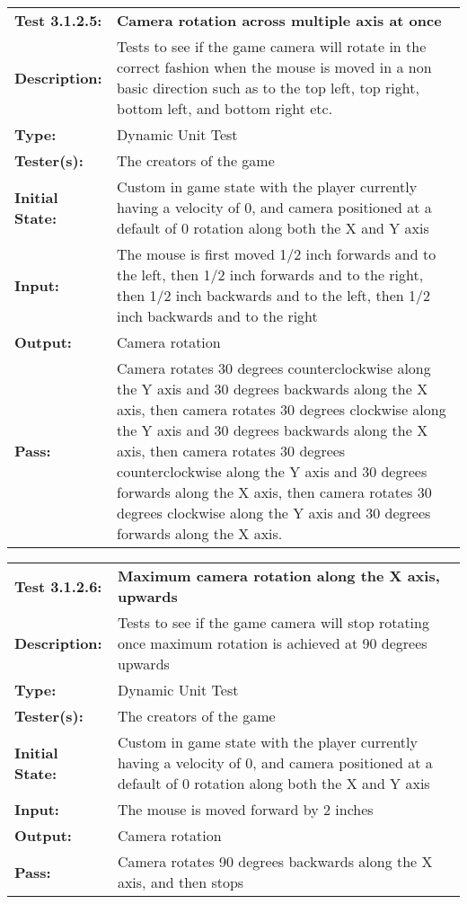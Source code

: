 \documentclass[12pt, titlepage]{article}
\begin{document}
\begin{mdframed}[linewidth=1pt]
\begin{tabularx}{\textwidth}{@{}p{3cm}X@{}}
{\bf Test 3.1.2.5:} & {\bf Camera rotation across multiple axis at once}\\[\baselineskip]
{\bf Description:} & Tests to see if the game camera will rotate in the correct fashion when the mouse is moved in a non basic direction such as to the top left,  top right, bottom left, and bottom right etc. \\[0.5\baselineskip]
{\bf Type:} & Dynamic Unit Test\\[0.5\baselineskip]
{\bf Tester(s):} & The creators of the game\\[0.5\baselineskip]
{\bf Initial State:} & Custom in game state with the player currently having a velocity of 0, and camera positioned at a default of 0 rotation along both the X and Y axis\\[0.5\baselineskip]
{\bf Input:} & The mouse is first moved 1/2 inch forwards and to the left, then 1/2 inch forwards and to the right, then 1/2 inch backwards and to the left, then 1/2 inch backwards and to the right\\[0.5\baselineskip]
{\bf Output:} & Camera rotation\\[0.5\baselineskip]
{\bf Pass:} & Camera rotates 30 degrees counterclockwise along the Y axis and 30 degrees backwards along the X axis, then camera rotates 30 degrees clockwise along the Y axis and 30 degrees backwards along the X axis, then camera rotates 30 degrees counterclockwise along the Y axis and 30 degrees forwards along the X axis, then camera rotates 30 degrees clockwise along the Y axis and 30 degrees forwards along the X axis.
\end{tabularx}
\end{mdframed}

\begin{mdframed}[linewidth=1pt]
\begin{tabularx}{\textwidth}{@{}p{3cm}X@{}}
{\bf Test 3.1.2.6:} & {\bf Maximum camera rotation along the X axis, upwards}\\[\baselineskip]
{\bf Description:} & Tests to see if the game camera will stop rotating once maximum rotation is achieved at 90 degrees upwards\\[0.5\baselineskip]
{\bf Type:} & Dynamic Unit Test\\[0.5\baselineskip]
{\bf Tester(s):} & The creators of the game\\[0.5\baselineskip]
{\bf Initial State:} & Custom in game state with the player currently having a velocity of 0, and camera positioned at a default of 0 rotation along both the X and Y axis\\[0.5\baselineskip]
{\bf Input:} & The mouse is moved forward by 2 inches\\[0.5\baselineskip]
{\bf Output:} & Camera rotation\\[0.5\baselineskip]
{\bf Pass:} & Camera rotates 90 degrees backwards along the X axis, and then stops
\end{tabularx}
\end{mdframed}
\end{document}
